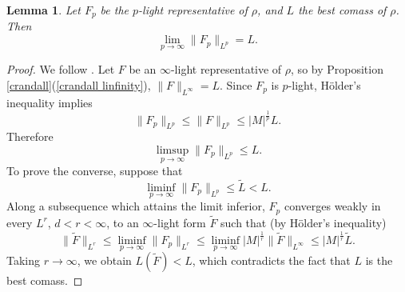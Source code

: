 \documentclass[reqno,11pt]{amsart}
\newcommand*\dif{\mathop{}\!\mathrm{d}}
\newtheorem{lemma}[theorem]{Lemma}
\theoremstyle{definition}
\numberwithin{equation}{section}
\begin{document}
\begin{lemma}\label{p lights approximate L}
Let $F_p$ be the $p$-light representative of $\rho$, and $L$ the best comass of $\rho$. Then 
$$\lim_{p \to \infty} \|F_p\|_{L^p} = L.$$
\end{lemma}
\begin{proof}
We follow \cite[Lemma 2.7]{daskalopoulos2020transverse}.
Let $F$ be an $\infty$-light representative of $\rho$, so by Proposition \ref{crandall}(\ref{crandall linfinity}), $\|F\|_{L^\infty} = L$.
Since $F_p$ is $p$-light, H\"older's inequality implies 
$$\|F_p\|_{L^p} \leq \|F\|_{L^p} \leq |M|^{\frac{1}{p}} L.$$
Therefore 
$$\limsup_{p \to \infty} \|F_p\|_{L^p} \leq L.$$
To prove the converse, suppose that 
$$\liminf_{p \to \infty} \|F_p\|_{L^p} \leq \tilde L < L.$$
Along a subsequence which attains the limit inferior, $F_p$ converges weakly in every $L^r$, $d < r < \infty$, to an $\infty$-light form $\tilde F$ such that (by H\"older's inequality)
$$\|\tilde F\|_{L^r} \leq \liminf_{p \to \infty} \|F_p\|_{L^r} \leq \liminf_{p \to \infty} |M|^{\frac{1}{r}} \|\tilde F\|_{L^\infty} \leq |M|^{\frac{1}{r}} \tilde L.$$
Taking $r \to \infty$, we obtain $L(\tilde F) < L$, which contradicts the fact that $L$ is the best comass.
\end{proof}


\end{document}
